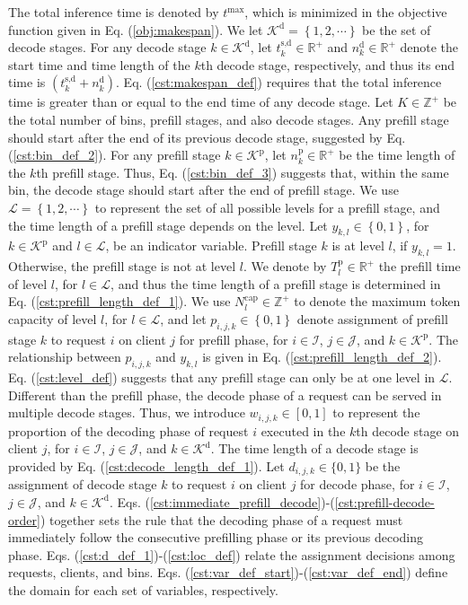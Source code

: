 The total inference time is denoted by $t^\text{max}$, which is minimized in the objective function given in Eq. (\ref{obj:makespan}). We let $\mathcal{K}^\text{d}=\left\{1,2,\cdots \right\}$ be the set of decode stages. For any decode stage $k\in \mathcal{K}^\text{d}$, let $t^\text{s,d}_{k}\in \mathbb{R}^+$ and $n^\text{d}_{k}\in \mathbb{R}^+$ denote the start time and time length of the $k$th decode stage, respectively, and thus its end time is $\left(t^\text{s,d}_{k}+n^\text{d}_{k}\right)$. Eq. (\ref{cst:makespan_def}) requires that the total inference time is greater than or equal to the end time of any decode stage. Let $K \in \mathbb{Z}^+$ be the total number of bins, prefill stages, and also decode stages. Any prefill stage should start after the end of its previous decode stage, suggested by Eq. (\ref{cst:bin_def_2}). For any prefill stage $k\in \mathcal{K}^\text{p}$, let $n^\text{p}_{k}\in \mathbb{R}^+$ be the time length of the $k$th prefill stage. Thus, Eq. (\ref{cst:bin_def_3}) suggests that, within the same bin, the decode stage should start after the end of prefill stage. We use $\mathcal{L}=\left\{1,2,\cdots \right\}$  to represent the set of all possible levels for a prefill stage, and the time length of a prefill stage depends on the level. Let $y_{k,l}\in \left\{0,1\right\}$, for $k\in \mathcal{K}^\text{p}$ and $l \in \mathcal{L}$, be an indicator variable. Prefill stage $k$ is at level $l$, if $y_{k,l}=1$. Otherwise, the prefill stage is not at level $l$. We denote by $T^\text{p}_l \in \mathbb{R}^+$ the prefill time of level $l$, for $l\in \mathcal{L}$, and thus the time length of a prefill stage is determined in Eq. (\ref{cst:prefill_length_def_1}). We use $N^\text{cap}_l \in \mathbb{Z}^+$ to denote the maximum token capacity of level $l$, for $l\in \mathcal{L}$, and let $p_{i,j,k}\in \left\{0,1\right\}$ denote assignment of prefill stage $k$ to request $i$ on client $j$ for prefill phase, for $i\in \mathcal{I}$, $j\in \mathcal{J}$, and $k\in \mathcal{K}^\text{p}$. The relationship between $p_{i,j,k}$ and $y_{k,l}$ is given in Eq. (\ref{cst:prefill_length_def_2}). Eq. (\ref{cst:level_def}) suggests that any prefill stage can only be at one level in $\mathcal{L}$. Different than the prefill phase, the decode phase of a request can be served in multiple decode stages. Thus, we introduce $w_{i,j,k}\in [0,1]$ to represent the proportion of the decoding phase of request $i$ executed in the $k$th decode stage on client $j$, for $i\in \mathcal{I}$, $j\in \mathcal{J}$, and $k\in \mathcal{K}^\text{d}$. The time length of a decode stage is provided by Eq. (\ref{cst:decode_length_def_1}). Let $d_{i,j,k}\in \{0,1\}$ be the assignment of decode stage $k$ to request $i$ on client $j$ for decode phase, for $i\in \mathcal{I}$, $j\in \mathcal{J}$, and $k\in \mathcal{K}^\text{d}$. Eqs. (\ref{cst:immediate_prefill_decode})-(\ref{cst:prefill-decode-order}) together sets the rule that the decoding phase of a request must immediately follow the consecutive prefilling phase or its previous decoding phase. Eqs. (\ref{cst:d_def_1})-(\ref{cst:loc_def}) relate the assignment decisions among requests, clients, and bins. Eqs. (\ref{cst:var_def_start})-(\ref{cst:var_def_end}) define the domain for each set of variables, respectively.

